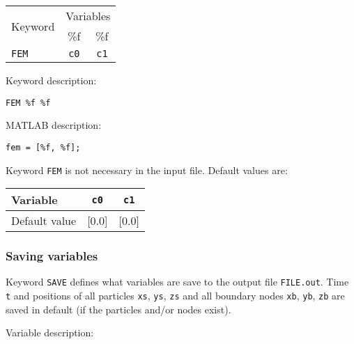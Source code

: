\begin{tabular}{|l|c|c|}
\hline
\multirow{2}{*}{Keyword} & \multicolumn{2}{c|}{Variables} \\ \cline{2-3}
& \%f & \%f \\ \hline
\texttt{FEM} & \texttt{c0} & \texttt{c1} \\ \hline
\end{tabular}

Keyword description:

\begin{tcolorbox}
\texttt{FEM \%f \%f}
\end{tcolorbox}

MATLAB description:

\begin{tcolorbox}
\texttt{fem = [\%f, \%f];}
\end{tcolorbox}

Keyword \texttt{FEM} is not necessary in the input file. Default values are:

\begin{tabular}{|l|c|c|}
\hline
Variable & \texttt{c0} & \texttt{c1} \\ \hline
Default value & [0.0] & [0.0] \\ \hline
\end{tabular}

\newpage


\subsubsection{Saving variables}

Keyword \texttt{SAVE} defines what variables are save to the output file \texttt{FILE.out}. Time \texttt{t} and positions of all particles \texttt{xs}, \texttt{ys}, \texttt{zs} and all boundary nodes \texttt{xb}, \texttt{yb}, \texttt{zb} are saved in default (if the particles and/or nodes exist).

Variable description:

